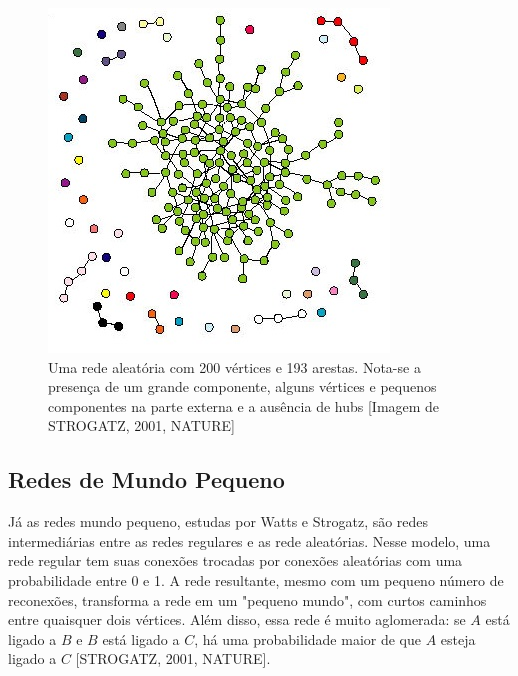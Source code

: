 \documentclass[xindy,rascunho]{fei}
\begin{document}
\begin{figure}
\centering
\includegraphics[width=0.7\linewidth]{./Imagens_Monografia/410268ac2(RedeAleatoria).jpg}
\caption{Uma rede aleatória com 200 vértices e 193 arestas. Nota-se a presença de um grande componente, alguns vértices e pequenos componentes na parte externa e a ausência de hubs [Imagem de STROGATZ, 2001, NATURE]}
\label{fig:RedeAleatoria}
\end{figure}


\subsection{Redes de Mundo Pequeno}

Já as redes mundo pequeno, estudas por Watts e Strogatz, são redes intermediárias entre as redes regulares e as rede aleatórias. Nesse modelo, uma rede regular tem suas conexões trocadas por conexões aleatórias com uma probabilidade entre 0 e 1. A rede resultante, mesmo com um pequeno número de reconexões, transforma a rede em um "pequeno mundo", com curtos caminhos entre quaisquer dois vértices. Além disso, essa rede é muito aglomerada: se $A$ está ligado a $B$ e $B$ está ligado a $C$, há uma probabilidade maior de que $A$ esteja ligado a $C$ [STROGATZ, 2001, NATURE].
\end{document}
